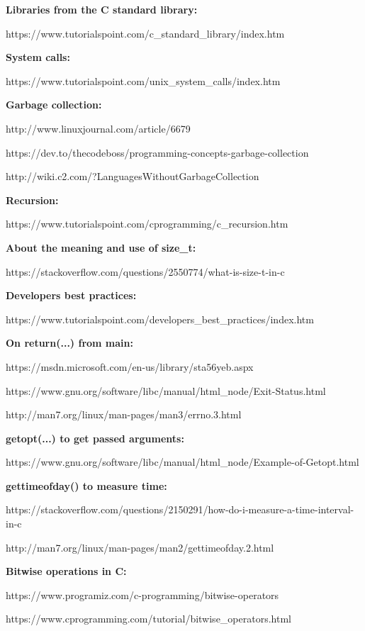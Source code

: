 \documentclass[11pt]{article}
\begin{document}
\textbf{Libraries from the C standard library:}

https://www.tutorialspoint.com/c\_standard\_library/index.htm

\textbf{System calls:}

https://www.tutorialspoint.com/unix\_system\_calls/index.htm

\textbf{Garbage collection:}

http://www.linuxjournal.com/article/6679

https://dev.to/thecodeboss/programming-concepts-garbage-collection

http://wiki.c2.com/?LanguagesWithoutGarbageCollection

\textbf{Recursion:}

https://www.tutorialspoint.com/cprogramming/c\_recursion.htm

\textbf{About the meaning and use of size\_t:}

https://stackoverflow.com/questions/2550774/what-is-size-t-in-c

\textbf{Developers best practices:}

https://www.tutorialspoint.com/developers\_best\_practices/index.htm

\textbf{On return(...) from main:}

https://msdn.microsoft.com/en-us/library/sta56yeb.aspx

https://www.gnu.org/software/libc/manual/html\_node/Exit-Status.html

http://man7.org/linux/man-pages/man3/errno.3.html


\textbf{getopt(...) to get passed arguments:}

https://www.gnu.org/software/libc/manual/html\_node/Example-of-Getopt.html

\textbf{gettimeofday() to measure time:}

https://stackoverflow.com/questions/2150291/how-do-i-measure-a-time-interval-in-c

http://man7.org/linux/man-pages/man2/gettimeofday.2.html

\textbf{Bitwise operations in C:}

https://www.programiz.com/c-programming/bitwise-operators

https://www.cprogramming.com/tutorial/bitwise\_operators.html
\end{document}
